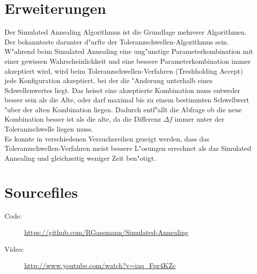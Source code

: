 \section{Erweiterungen}
	Der Simulated Annealing Algorithmus ist die Grundlage mehrerer Algorithmen. Der bekannteste darunter d"urfte der Toleranzschwellen-Algorithmus sein.\\
W"ahrend beim Simulated Annealing eine ung"unstige Parameterkombination mit einer gewissen Wahrscheinlichkeit und eine bessere Parameterkombination immer akzeptiert wird, wird beim Toleranzschwellen-Verfahren (Treshholding Accept) jede Konfiguration akzeptiert, bei der die "Anderung unterhalb eines Schwellenwertes liegt. Das heisst eine akzeptierte Kombination muss entweder besser sein als die Alte, oder darf maximal bis zu einem bestimmten Schwellwert "uber der alten Kombination liegen. Dadurch entf"allt die Abfrage ob die neue Kombination besser ist als die alte, da die Differenz $\Delta f$ immer unter der Toleranzschwelle liegen muss.\\
Es konnte in verschiedenen Versuchsreihen gezeigt werden, dass das Toleranzschwellen-Verfahren meist bessere L"osungen errechnet als das Simulated Annealing und gleichzeitig weniger Zeit ben"otigt.

\section{Sourcefiles}
	\begin{description}
		\item [Code:] \url{https://github.com/RGassmann/Simulated-Annealing}
		\item [Video:] \url{http://www.youtube.com/watch?v=iaq_Fpr4KZc}
	\end{description}
